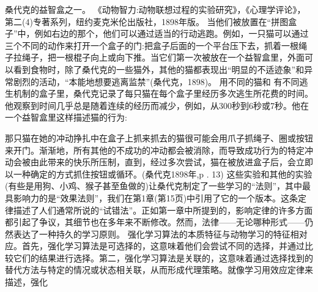 桑代克的益智盒之一。
《动物智力:动物联想过程的实验研究》，《心理学评论》，第二(4)专著系列，纽约麦克米伦出版社，1898年版。
当他们被放置在“拼图盒子”中，例如右边的那个，他们可以通过适当的行动逃跑。例如，一只猫可以通过三个不同的动作来打开一个盒子的门:把盒子后面的一个平台压下去，抓着一根绳子拉绳子，把一根棍子向上或向下推。当它们第一次被放在一个益智盒里，外面可以看到食物时，除了桑代克的一些猫外，其他的猫都表现出“明显的不适迹象”和异常剧烈的活动，“本能地想要逃离监禁”(桑代克，1898)。
用不同的猫和
有不同逃生机制的盒子里，桑代克记录了每只猫在每个盒子里经历多次逃生所花费的时间。他观察到时间几乎总是随着连续的经历而减少，例如，从300秒到6秒或7秒。他在一个益智盒里这样描述猫的行为:

那只猫在她的冲动挣扎中在盒子上抓来抓去的猫很可能会用爪子抓绳子、圈或按钮来开门。渐渐地，所有其他的不成功的冲动都会被消除，而导致成功行为的特定冲动会被由此带来的快乐所压制，直到，经过多次尝试，猫在被放进盒子后，会立即以一种确定的方式抓住按钮或循环。(桑代克1898年,p . 13)
这些实验和其他的实验(有些是用狗、小鸡、猴子甚至鱼做的)让桑代克制定了一些学习的“法则”，其中最具影响力的是“效果法则”，我们在第1章(第15页)中引用了它的一个版本。这条定律描述了人们通常所说的“试错法”。正如第一章中所提到的，影响定律的许多方面都引起了争议，其细节也在多年来不断修改。然而，法律——无论哪种形式——仍然表达了一种持久的学习原则。
强化学习算法的本质特征与动物学习的特征相对应。首先，强化学习算法是可选择的，这意味着他们会尝试不同的选择，并通过比较它们的结果进行选择。第二，强化学习算法是关联的，这意味着通过选择找到的替代方法与特定的情况或状态相关联，从而形成代理策略。就像学习用效应定律来描述，强化

